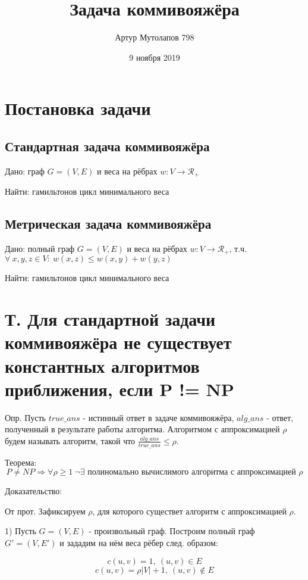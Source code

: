 \documentclass[a4paper,12pt]{article}
\title{Задача коммивояжёра}
\author{Артур Мутолапов 798}
\date{9 ноября 2019}
\begin{document}
\maketitle

\section{Постановка задачи}

\subsection{Стандартная задача коммивояжёра}
Дано: граф $ G = (V, E) $ и веса на рёбрах $ w: V \rightarrow \mathscr{R}_{+}$

Найти: гамильтонов цикл минимального веса

\subsection{Метрическая задача коммивояжёра}

Дано: полный граф $ G = (V, E) $ и веса на рёбрах $ w: V \rightarrow \mathscr{R}_{+}$, т.ч. $\forall \: x, y, z \in V : \: w(x, z) \leq w(x, y) + w(y, z)$ 

Найти: гамильтонов цикл минимального веса

\section{Т. Для стандартной задачи коммивояжёра не существует константных алгоритмов приближения, если P != NP}

Опр. Пусть $true\_ans$ - истинный ответ в задаче коммивояжёра, $alg\_ans$ - ответ, полученный в результате работы алгоритма. Алгоритмом с аппроксимацией $\rho$ будем называть алгоритм, такой что $\frac{alg\_ans} {true\_ans} \leq \rho$. 


Теорема: 
$$ P \neq NP \Rightarrow \forall \rho \geq 1 \: \neg{\exists} \text{ полиномально вычислимого алгоритма с аппроксимацией } \rho
$$

Доказательство:

От прот. Зафиксируем $\rho$, для которого существет алгоритм с аппроксимацией $\rho$.

1) Пусть $ G = (V, E)$ - произвольный граф. Построим полный граф $ G' = (V, E')$ и зададим на нём веса рёбер след. образом:

$$ c(u, v) = 1, \: (u,v) \in E $$
$$ c(u, v) = \rho |V| + 1, \: (u,v) \notin E $$
\end{document}
